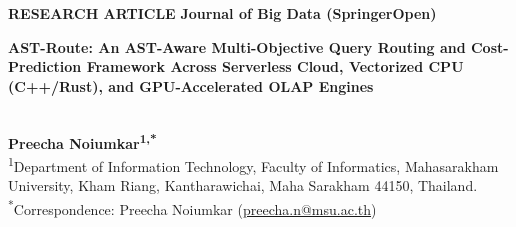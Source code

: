 \documentclass[10pt,a4paper]{article}
\begin{document}
\linenumbers
\expandafter\def\expandafter\UrlBreaks\expandafter{\UrlBreaks\do\-\do\_\do\/\do\.\do\0\do\1\do\2\do\3\do\4\do\5\do\6\do\7\do\8\do\9\do\a\do\b\do\c\do\d\do\e\do\f}

{\footnotesize\sffamily\color{springerblue}\textbf{RESEARCH ARTICLE} \hfill \textbf{Journal of Big Data (SpringerOpen)}}\\[0.8em]

{\raggedright\LARGE\sffamily\bfseries AST-Route: An AST-Aware Multi-Objective Query Routing and Cost-Prediction Framework Across Serverless Cloud, \mbox{Vectorized} CPU (C++/Rust), and GPU-Accelerated OLAP Engines}\\[0.9em]

{\large\textbf{Preecha Noiumkar\textsuperscript{1,*}}}\\[4pt]
\textsuperscript{1}Department of Information Technology, Faculty of Informatics, Mahasarakham University, Kham Riang, \mbox{Kantharawichai}, Maha Sarakham 44150, Thailand.\\
\textsuperscript{*}Correspondence: Preecha Noiumkar (\href{mailto:preecha.n@msu.ac.th}{preecha.n@msu.ac.th})\\[0.8em]
\end{document}
